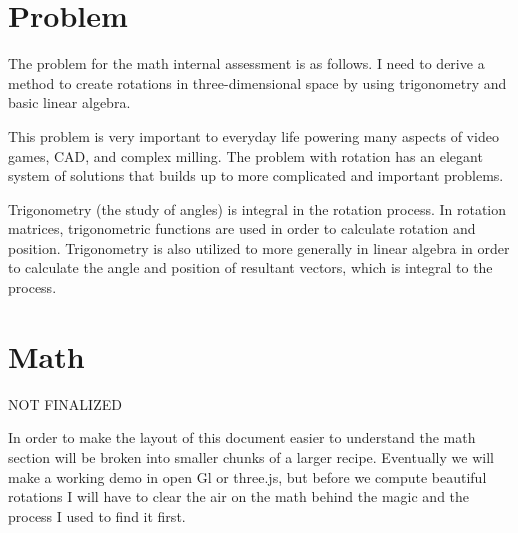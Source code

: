 \section{Problem}

\hspace{\parindent}%
The problem for the math internal assessment is as follows. I need to derive a method to create rotations in three-dimensional space by using trigonometry and basic linear algebra.

This problem is very important to everyday life powering many aspects of video games, CAD, and complex milling. The problem with rotation has an elegant system of solutions that builds up to more complicated and important problems.

Trigonometry (the study of angles) is integral in the rotation process. In rotation matrices, trigonometric functions are used in order to calculate rotation and position. Trigonometry is also utilized to more generally in linear algebra in order to calculate the angle and position of resultant vectors, which is integral to the process.

\section{Math}

\hspace{\parindent}%
NOT FINALIZED

In order to make the layout of this document easier to understand the math section will be broken into smaller chunks of a larger recipe. Eventually we will make a working demo in open Gl or three.js, but before we compute beautiful rotations I will have to clear the air on the math behind the magic and the process I used to find it first.


